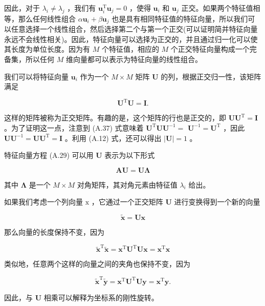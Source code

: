\documentclass[10pt]{report}
\begin{document}
因此，对于 \({\lambda }_{i} \neq  {\lambda }_{j}\) ，我们有 \({\mathbf{u}}_{i}^{\mathrm{T}}{\mathbf{u}}_{j} = 0\) ，使得 \({\mathbf{u}}_{i}\) 和 \({\mathbf{u}}_{j}\) 正交。如果两个特征值相等，那么任何线性组合 \(\alpha {\mathbf{u}}_{i} + \beta {\mathbf{u}}_{j}\) 也是具有相同特征值的特征向量，所以我们可以任意选择一个线性组合，然后选择第二个与第一个正交(可以证明简并特征向量永远不会线性相关)。因此，特征向量可以选择为正交的，并且通过归一化可以使其长度为单位长度。因为有 \(M\) 个特征值，相应的 \(M\) 个正交特征向量构成一个完备集，所以任何 \(M\) 维向量都可以表示为特征向量的线性组合。

我们可以将特征向量 \({\mathbf{u}}_{i}\) 作为一个 \(M \times  M\) 矩阵 \(\mathbf{U}\) 的列，根据正交归一性，该矩阵满足

\[
{\mathbf{U}}^{\mathrm{T}}\mathbf{U} = \mathbf{I}. \tag{A.37}
\]

这样的矩阵被称为正交矩阵。有趣的是，这个矩阵的行也是正交的，即 \(\mathbf{U}{\mathbf{U}}^{\mathrm{T}} = \mathbf{I}\) 。为了证明这一点，注意到 (A.37) 式意味着 \({\mathbf{U}}^{\mathrm{T}}\mathbf{U}{\mathbf{U}}^{-1} =\)  \({\mathbf{U}}^{-1} = {\mathbf{U}}^{\mathrm{T}}\) ，因此 \(\mathbf{U}{\mathbf{U}}^{-1} = \mathbf{U}{\mathbf{U}}^{\mathrm{T}} = \mathbf{I}\) 。利用 (A.12) 式，还可以得出 \(\left| \mathbf{U}\right|  = 1\) 。

特征向量方程 (A.29) 可以用 \(\mathbf{U}\) 表示为以下形式

\[
\mathbf{{AU}} = \mathbf{{U\Lambda }} \tag{A.38}
\]

其中 \(\mathbf{\Lambda }\) 是一个 \(M \times  M\) 对角矩阵，其对角元素由特征值 \({\lambda }_{i}\) 给出。

如果我们考虑一个列向量 \(\mathrm{x}\) ，它通过一个正交矩阵 \(\mathbf{U}\) 进行变换得到一个新的向量

\[
\widetilde{\mathbf{x}} = \mathbf{{Ux}} \tag{A.39}
\]

那么向量的长度保持不变，因为

\[
{\widetilde{\mathbf{x}}}^{\mathrm{T}}\widetilde{\mathbf{x}} = {\mathbf{x}}^{\mathrm{T}}{\mathbf{U}}^{\mathrm{T}}\mathbf{U}\mathbf{x} = {\mathbf{x}}^{\mathrm{T}}\mathbf{x} \tag{A.40}
\]

类似地，任意两个这样的向量之间的夹角也保持不变，因为

\[
{\widetilde{\mathbf{x}}}^{\mathrm{T}}\widetilde{\mathbf{y}} = {\mathbf{x}}^{\mathrm{T}}{\mathbf{U}}^{\mathrm{T}}\mathbf{U}\mathbf{y} = {\mathbf{x}}^{\mathrm{T}}\mathbf{y}. \tag{A.41}
\]

因此，与 \(\mathbf{U}\) 相乘可以解释为坐标系的刚性旋转。
\end{document}

